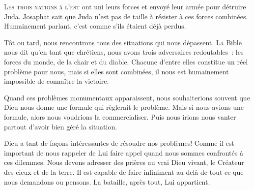 

\lettrine{L}{es trois nations à l'est} ont uni leurs forces et envoyé
 leur armée pour détruire Juda. Josaphat sait que Juda n'est pas de taille
 à résister à ces forces combinées.
 Humainement parlant, c'est comme s'ils étaient déjà perdus. 

Tôt ou tard, nous rencontrons tous des situations qui nous dépassent.
 La Bible nous dit qu'en tant que chrétiens,
 nous avons trois adversaires redoutables~: les forces du monde,
 de la chair et du diable. Chacune d'entre elles constitue un réel problème
 pour nous, mais si elles sont combinées, il nous est humainement impossible
 de connaître la victoire. 


Quand ces problèmes monumentaux apparaissent, nous souhaiterions souvent
 que Dieu nous donne une formule qui règlerait le problème.
 Mais si nous avions une formule, alors nous voudrions la commercialiser.
 Puis nous irions nous vanter partout d'avoir bien géré la situation. 

Dieu a tant de façons intéressantes de résoudre nos problèmes!
 Comme il est important de nous rappeler de Lui faire appel quand nous sommes
 confrontés à ces dilemmes. Nous devons adresser des prières
 au vrai Dieu vivant, le Créateur des cieux et de la terre.
 Il est capable de faire infiniment au-delà de tout ce que nous demandons
 ou pensons. La bataille, après tout, Lui appartient. 

\dvrule






